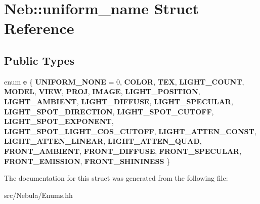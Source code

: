\hypertarget{structNeb_1_1uniform__name}{\section{\-Neb\-:\-:uniform\-\_\-name \-Struct \-Reference}
\label{structNeb_1_1uniform__name}
}
\subsection*{\-Public \-Types}
\begin{DoxyCompactItemize}
\item 
enum {\bfseries e} \{ \*
{\bfseries \-U\-N\-I\-F\-O\-R\-M\-\_\-\-N\-O\-N\-E} =  0, 
{\bfseries \-C\-O\-L\-O\-R}, 
{\bfseries \-T\-E\-X}, 
{\bfseries \-L\-I\-G\-H\-T\-\_\-\-C\-O\-U\-N\-T}, 
\*
{\bfseries \-M\-O\-D\-E\-L}, 
{\bfseries \-V\-I\-E\-W}, 
{\bfseries \-P\-R\-O\-J}, 
{\bfseries \-I\-M\-A\-G\-E}, 
\*
{\bfseries \-L\-I\-G\-H\-T\-\_\-\-P\-O\-S\-I\-T\-I\-O\-N}, 
{\bfseries \-L\-I\-G\-H\-T\-\_\-\-A\-M\-B\-I\-E\-N\-T}, 
{\bfseries \-L\-I\-G\-H\-T\-\_\-\-D\-I\-F\-F\-U\-S\-E}, 
{\bfseries \-L\-I\-G\-H\-T\-\_\-\-S\-P\-E\-C\-U\-L\-A\-R}, 
\*
{\bfseries \-L\-I\-G\-H\-T\-\_\-\-S\-P\-O\-T\-\_\-\-D\-I\-R\-E\-C\-T\-I\-O\-N}, 
{\bfseries \-L\-I\-G\-H\-T\-\_\-\-S\-P\-O\-T\-\_\-\-C\-U\-T\-O\-F\-F}, 
{\bfseries \-L\-I\-G\-H\-T\-\_\-\-S\-P\-O\-T\-\_\-\-E\-X\-P\-O\-N\-E\-N\-T}, 
{\bfseries \-L\-I\-G\-H\-T\-\_\-\-S\-P\-O\-T\-\_\-\-L\-I\-G\-H\-T\-\_\-\-C\-O\-S\-\_\-\-C\-U\-T\-O\-F\-F}, 
\*
{\bfseries \-L\-I\-G\-H\-T\-\_\-\-A\-T\-T\-E\-N\-\_\-\-C\-O\-N\-S\-T}, 
{\bfseries \-L\-I\-G\-H\-T\-\_\-\-A\-T\-T\-E\-N\-\_\-\-L\-I\-N\-E\-A\-R}, 
{\bfseries \-L\-I\-G\-H\-T\-\_\-\-A\-T\-T\-E\-N\-\_\-\-Q\-U\-A\-D}, 
{\bfseries \-F\-R\-O\-N\-T\-\_\-\-A\-M\-B\-I\-E\-N\-T}, 
\*
{\bfseries \-F\-R\-O\-N\-T\-\_\-\-D\-I\-F\-F\-U\-S\-E}, 
{\bfseries \-F\-R\-O\-N\-T\-\_\-\-S\-P\-E\-C\-U\-L\-A\-R}, 
{\bfseries \-F\-R\-O\-N\-T\-\_\-\-E\-M\-I\-S\-S\-I\-O\-N}, 
{\bfseries \-F\-R\-O\-N\-T\-\_\-\-S\-H\-I\-N\-I\-N\-E\-S\-S}
 \}
\end{DoxyCompactItemize}


\-The documentation for this struct was generated from the following file\-:\begin{DoxyCompactItemize}
\item 
src/\-Nebula/\-Enums.\-hh\end{DoxyCompactItemize}
